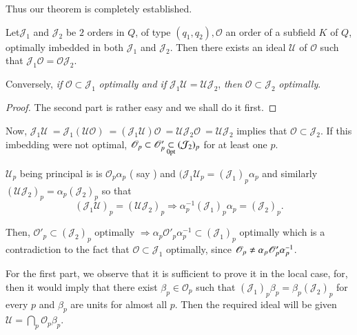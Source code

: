 Thus our theorem is completely established.

\begin{theorem}\label{chap4:sec9:thm4}%
  Let\pageoriginale $ \mathcal{J}_1 $ and  $ \mathcal{J}_2 $ be $2$ orders in
    $Q$, of type  $  ( q_1, q_2), \mathscr{O}$ an order of a subfield
    $K$ of $Q$, optimally imbedded in both $\mathcal{J}_1 $ and $
    \mathcal{J}_2  $. Then there  exists an ideal $\mathscr{U} $  of
    $\mathscr{O} $ such that $ \mathcal{J}_1 \mathscr{O} = \mathscr{O}
    \mathcal{J}_2 $.  
\end{theorem}

Conversely, \textit{if} $ \mathscr{O} \subset \mathcal{J}_1 $
\textit{optimally and if } $ \mathcal{J}_1 \mathscr{U} = \mathscr{U}
\mathcal{J}_2 $, \textit{then} $ \mathscr{O} \subset \mathcal{J}_2 $
\textit{optimally}. 

\begin{proof}
  The second part is rather easy and we shall do it first. 
\end{proof}

Now, $ \mathcal{J}_1 \mathscr{U} ~= \mathcal{J}_1 ( \mathscr{U}
\mathscr{O} ) ~= ( \mathcal{J}_1 \mathscr{U} ) \mathscr{O} ~ =
\mathscr{U} \mathcal{J}_2 \mathscr{O} ~= \mathscr{U} \mathcal{J}_2  $
implies that $ \mathscr{O} \subset \mathcal{J}_2 $. If this imbedding
were not optimal, $ \mathscr{O}_p \subset \mathscr{O}'_p
\subs\limits_{\0pt} ~ ( \mathcal{J}_2 )_p $ for at least one $p$. 

$ \mathscr{U}_p $  being principal is  is $ \mathscr{O}_p \alpha_p $ (
say ) and $ ( \mathcal{J}_1 \mathscr{U}_p = (\mathcal{J}_1)_p \alpha_p
$ and similarly $ ( \mathscr{U} \mathcal{J}_2)_p  = \alpha_p  (
\mathcal{J}_2 )_p $ so that  
$$
( \mathcal{J}_1 \mathscr{U} )_p = ( \mathscr{U} \mathcal{J}_2 )_p
\Rightarrow \alpha^{-1}_p (\mathcal{J}_1 )_p \alpha_p = (
\mathcal{J}_2 )_p. 
$$

Then, $ \mathscr{O}'_p \subset ( \mathcal{J}_2 )_p $ optimally $
\Rightarrow \alpha_p \mathscr{O}'_p \alpha^{-1}_p \subset (
\mathcal{J}_1 )_p $ optimally which is a contradiction to the fact
that $ \mathscr{O} \subset \mathcal{J}_1$ optimally, since $
\mathscr{O}_p \neq \alpha_p\break \mathscr{O}'_p \alpha^{-1}_p $. 

For the first part, we observe that it is sufficient to prove it in
the local case, for, then it would imply that there exist $ \beta_p
\in \mathscr{O}_p $ such that $ ( \mathcal{J}_1 )_p \beta_p = \beta_p
( \mathcal{J}_2 )_p $ for every $p$ and $ \beta_p $ are units for
almost all $p$. Then the required ideal will be given  $ \mathcal{U}
= \bigcap \limits_{p} \mathscr{O}_p \beta_p $. 

